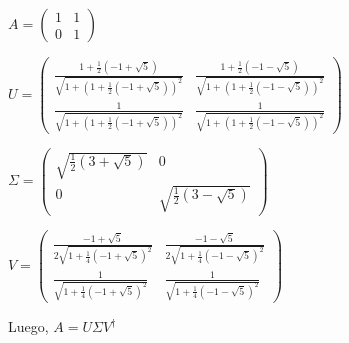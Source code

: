 \documentclass[a4paper,11pt]{article}
\begin{document}
$
A = 
\begin{pmatrix}
1 & 1\\ 
0 & 1
\end{pmatrix}
$

$
U =
\begin{pmatrix}
\frac{1+\frac{1}{2}\left ( -1 + \sqrt{5} \right )}{\sqrt{1 + \left ( 1 +\frac{1}{2} 
\left ( -1 + \sqrt{5} \right ) \right )^2}} 

& \frac{1+\frac{1}{2}\left ( -1 - \sqrt{5} \right )}{\sqrt{1 + \left ( 1 +\frac{1}{2} 
\left ( -1 - \sqrt{5} \right ) \right )^2}} 

\\ 

\frac{1}{\sqrt{1 + \left ( 1 +\frac{1}{2} 
\left ( -1 + \sqrt{5} \right ) \right )^2}} 
 
& \frac{1}{\sqrt{1 + \left ( 1 +\frac{1}{2} 
\left ( -1 - \sqrt{5} \right ) \right )^2}} 
\end{pmatrix}
$

$
\Sigma =
\begin{pmatrix}
\sqrt{\frac{1}{2}\left ( 3 + \sqrt{5} \right )}
& 0
\\ 
0
& \sqrt{\frac{1}{2}\left ( 3 - \sqrt{5} \right )}
\end{pmatrix}
$

$V = 
\begin{pmatrix}
\frac{-1 + \sqrt{5}}{2\sqrt{1 + \frac{1}{4}\left ( -1 + \sqrt{5}\right )^2}} 

& \frac{-1 - \sqrt{5}}{2\sqrt{1 + \frac{1}{4}\left ( -1 - \sqrt{5}\right )^2}} 

\\ 

\frac{1}{\sqrt{1 + \frac{1}{4}\left ( -1 + \sqrt{5}\right )^2}} 

& \frac{1}{\sqrt{1 + \frac{1}{4}\left ( -1 - \sqrt{5}\right )^2}} 
\end{pmatrix}$

Luego, $A = U \Sigma V^{\dag}$
\end{document}
